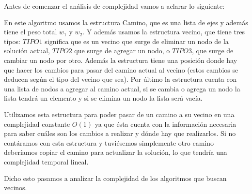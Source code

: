 Antes de comenzar el análisis de complejidad vamos a aclarar lo siguiente:

En este algoritmo usamos la estructura Camino, que es una lista de ejes y además tiene el peso total $w_1$ y $w_2$. Y además usamos la estructura vecino, que tiene tres tipos: $TIPO1$ significa que es un vecino que surge de eliminar un nodo de la solución actual, $TIPO2$ que surge de agregar un nodo, o $TIPO3$, que surge de cambiar un nodo por otro. Además la estructura tiene una posición donde hay que hacer los cambios para pasar del camino actual al vecino (estos cambios se deducen según el tipo del vecino que sea). Por último la estructura cuenta con una lista de nodos a agregar al camino actual, si se cambia o agrega un nodo la lista tendrá un elemento y si se elimina un nodo la lista será vacía.

Utilizamos esta estructura para poder pasar de un camino a su vecino en una complejidad constante $O(1)$ ya que ésta cuenta con la información necesaria para saber cuáles son los cambios a realizar y dónde hay que realizarlos. Si no contáramos con esta estructura y tuviésemos simplemente otro camino deberíamos copiar el camino para actualizar la solución, lo que tendría una complejidad temporal lineal.

Dicho esto pasamos a analizar la complejidad de los algoritmos que buscan vecinos.

